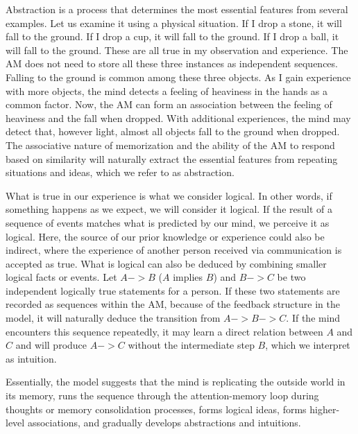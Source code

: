 \documentclass[reprint,amsmath,amssymb,apr,aip,onecolumn, 11pt]{revtex4-1}
\begin{document}
 Abstraction  is a process that determines the most essential features from several examples. Let us examine it using a physical situation. If I drop a stone, it will fall to the ground. If I drop a cup, it will fall to the ground. If I drop a ball, it will fall to the ground. These are all true in my observation and experience. The AM does not need to store all these three instances as independent sequences. Falling to the ground is common among these three objects. As I gain experience with more objects, the mind detects a feeling of heaviness in the hands as a common factor. Now, the AM can form an association between the feeling of heaviness and the fall when dropped. With additional experiences, the mind may detect that, however light, almost all objects fall to the ground when dropped. The associative nature of memorization and the ability of the AM to respond based on similarity will naturally extract the essential features from repeating situations and ideas, which we refer to as abstraction. 
 
 What is true in our experience is what we consider logical. In other words, if something happens as we expect, we will consider it logical. If the result of a sequence of events matches what is predicted by our mind, we perceive it as logical. Here, the source of our prior knowledge or experience could also be indirect, where the experience of another person received via communication is accepted as true. What is logical can also be deduced by combining smaller logical facts or events.  Let $A->B$ ($A$ implies $B$) and $B->C$ be two independent logically true statements for a person. If these two statements are recorded as sequences within the AM, because of the feedback structure in the model, it will naturally deduce the transition from  $A->B->C$.  If the mind encounters this sequence repeatedly, it may learn a direct relation between $A$ and $C$ and will produce $A->C$ without the intermediate step $B$, which we interpret as intuition. 
 
 Essentially, the model suggests that the mind is replicating the outside world in its memory, runs the sequence through the attention-memory loop during thoughts or memory consolidation processes, forms logical ideas, forms higher-level associations, and gradually develops abstractions and intuitions. 
 
\end{document}

